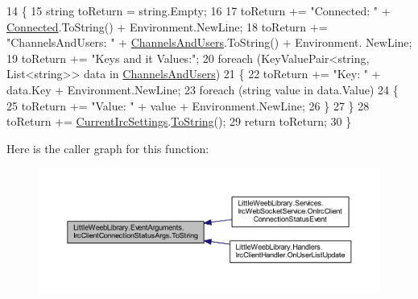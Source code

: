 \begin{DoxyCode}
14         \{
15             \textcolor{keywordtype}{string} toReturn = \textcolor{keywordtype}{string}.Empty;
16 
17             toReturn += \textcolor{stringliteral}{"Connected: "} + \mbox{\hyperlink{class_little_weeb_library_1_1_event_arguments_1_1_irc_client_connection_status_args_a4df4d6c89f98fcbe91ee1ecb40066a77}{Connected}}.ToString() + Environment.NewLine;
18             toReturn += \textcolor{stringliteral}{"ChannelsAndUsers: "} + \mbox{\hyperlink{class_little_weeb_library_1_1_event_arguments_1_1_irc_client_connection_status_args_a51cbce60bdb96d0b461d5a6e84940072}{ChannelsAndUsers}}.ToString() + Environment.
      NewLine;
19             toReturn += \textcolor{stringliteral}{"Keys and it Values:"};
20             \textcolor{keywordflow}{foreach} (KeyValuePair<\textcolor{keywordtype}{string}, List<string>> data \textcolor{keywordflow}{in} \mbox{\hyperlink{class_little_weeb_library_1_1_event_arguments_1_1_irc_client_connection_status_args_a51cbce60bdb96d0b461d5a6e84940072}{ChannelsAndUsers}})
21             \{
22                 toReturn += \textcolor{stringliteral}{"Key: "} + data.Key + Environment.NewLine;
23                 \textcolor{keywordflow}{foreach} (\textcolor{keywordtype}{string} value \textcolor{keywordflow}{in} data.Value)
24                 \{
25                     toReturn += \textcolor{stringliteral}{"Value: "} + value + Environment.NewLine;
26                 \}
27             \}
28             toReturn += \mbox{\hyperlink{class_little_weeb_library_1_1_event_arguments_1_1_irc_client_connection_status_args_a0cdd120909dbddabaa080c5a1dabb81d}{CurrentIrcSettings}}.\mbox{\hyperlink{class_little_weeb_library_1_1_settings_1_1_irc_settings_a2e1d7f26d7d3083d19c3a9e6c6c2d0b2}{ToString}}();
29             \textcolor{keywordflow}{return} toReturn;
30         \}
\end{DoxyCode}
Here is the caller graph for this function\+:\nopagebreak
\begin{figure}[H]
\begin{center}
\leavevmode
\includegraphics[width=350pt]{class_little_weeb_library_1_1_event_arguments_1_1_irc_client_connection_status_args_a71fdd09abcc607734be01125338fa928_icgraph}
\end{center}
\end{figure}


